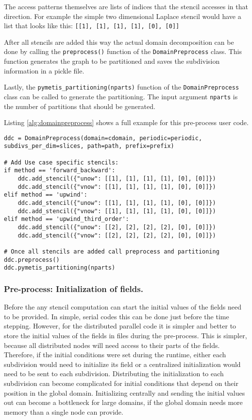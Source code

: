 The access patterns themselves are lists of indices that the stencil accesses in that direction.
For example the simple two dimensional Laplace stencil would have a list that looks like this: \texttt{[[1], [1], [1], [1], [0], [0]]}

After all stencils are added this way the actual domain decomposition can be done by calling the \texttt{preprocess()} function of the \texttt{DomainPreprocess} class.
This function generates the graph to be partitioned and saves the subdivision information in a pickle file.

Lastly, the \texttt{pymetis\_partitioning(nparts)} function of the \texttt{DomainPreprocess} class can be called to generate the partitioning. The input argument \texttt{nparts} is the number of partitions that should be generated.

Listing \ref{alg:domainpreprocess} shows a full example for this pre-process user code.

\begin{lstlisting}[caption={Example code of the domain pre-process function calls and additional information needed to decompose a domain.},captionpos=b, label={alg:domainpreprocess}, float, floatplacement=H]
ddc = DomainPreprocess(domain=cdomain, periodic=periodic, subdivs_per_dim=slices, path=path, prefix=prefix)

# Add Use case specific stencils:
if method == 'forward_backward':
    ddc.add_stencil({"unow": [[1], [1], [1], [1], [0], [0]]})
    ddc.add_stencil({"vnow": [[1], [1], [1], [1], [0], [0]]})
elif method == 'upwind':
    ddc.add_stencil({"unow": [[1], [1], [1], [1], [0], [0]]})
    ddc.add_stencil({"vnow": [[1], [1], [1], [1], [0], [0]]})
elif method == 'upwind_third_order':
    ddc.add_stencil({"unow": [[2], [2], [2], [2], [0], [0]]})
    ddc.add_stencil({"vnow": [[2], [2], [2], [2], [0], [0]]})

# Once all stencils are added call preprocess and partitioning
ddc.preprocess()
ddc.pymetis_partitioning(nparts)
\end{lstlisting}

\subsubsection{Pre-process: Initialization of fields.}
Before the any stencil computation can start the initial values of the fields need to be provided.
In simple, serial codes this can be done just before the time stepping.
However, for the distributed parallel code it is simpler and better to store the initial values of the fields in files during the pre-process.
This is simpler, because all distributed nodes will need access to their parts of the fields.
Therefore, if the initial conditions were set during the runtime, either each subdivision would need to initialize its field or a centralized initialization would need to be sent to each subdivision.
Distributing the initialization to each subdivision can become complicated for initial conditions that depend on their position in the global domain.
Initializing centrally and sending the initial values out can become a bottleneck for large domains, if the global domain needs more memory than a single node can provide.

